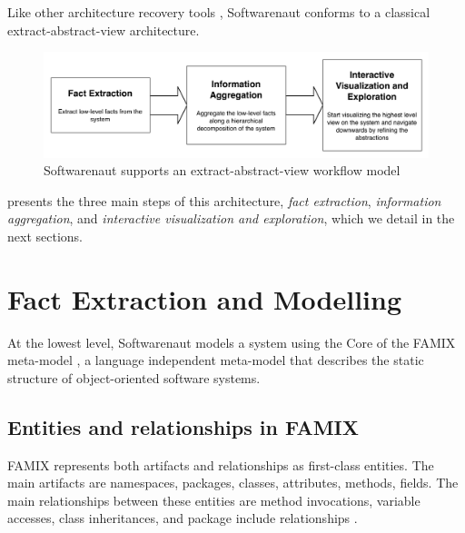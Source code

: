 \documentclass[preprint,12pt]{elsarticle}
\begin{document}
Like other architecture recovery tools \cite{pollet-sar}, Softwarenaut conforms to a classical extract-abstract-view architecture. 

\begin{figure}[h]
\begin{center}
\includegraphics[width=\linewidth]{SnautFlow}
\caption{Softwarenaut supports an extract-abstract-view workflow model}
\end{center}
\end{figure}

 presents the three main steps of this architecture, {\em fact extraction}, {\em information aggregation}, and {\em interactive visualization and exploration}, which we detail in the next sections.

\newpage

\section {Fact Extraction and Modelling} \label{sec:facts}

At the lowest level, Softwarenaut models a system using the Core of the FAMIX meta-model \cite{tichelaar-thesis}, a language independent meta-model that describes the static structure of object-oriented software systems. 

\subsection {Entities and relationships in FAMIX}

FAMIX represents both artifacts and relationships as first-class entities. The main artifacts are namespaces, packages, classes, attributes, methods, fields. The main relationships between these entities are method invocations, variable accesses, class inheritances, and package include relationships \cite{tichelaar-thesis}.
\end{document}
